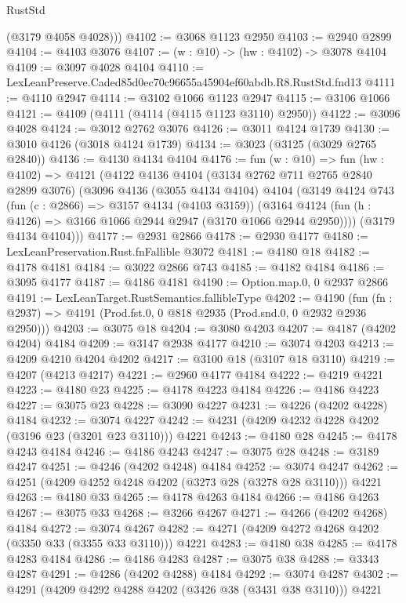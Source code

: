 \begin{lexlean}{RustStd}
\begin{coremodule}
        (@3179 @4058 @4028)))
@4102 := @3068 @1123 @2950
@4103 := @2940 @2899
@4104 := @4103 @3076
@4107 := (w : @10) -> (hw : @4102) -> @3078 @4104
@4109 := @3097 @4028 @4104
@4110 := LexLeanPreserve.Caded85d0ec70c96655a45904ef60abdb.R8.RustStd.fnd13
@4111 := @4110 @2947
@4114 := @3102 @1066 @1123 @2947
@4115 := @3106 @1066
@4121 := @4109 (@4111 (@4114 (@4115 @1123 @3110) @2950))
@4122 := @3096 @4028
@4124 := @3012 @2762 @3076
@4126 := @3011 @4124 @1739
@4130 := @3010 @4126 (@3018 @4124 @1739)
@4134 := @3023 (@3125 (@3029 @2765 @2840))
@4136 := @4130 @4134 @4104
@4176 := fun (w : @10) =>
  fun (hw : @4102) =>
  @4121
    (@4122
      @4136
      @4104
      (@3134 @2762 @711 @2765 @2840 @2899 @3076)
      (@3096
        @4136
        (@3055 @4134 @4104)
        @4104
        (@3149
          @4124
          @743
          (fun (c : @2866) => @3157 @4134 (@4103 @3159))
          (@3164 @4124 (fun (h : @4126) => @3166 @1066 @2944 @2947 (@3170 @1066 @2944 @2950))))
        (@3179 @4134 @4104)))
@4177 := @2931 @2866
@4178 := @2930 @4177
@4180 := LexLeanPreservation.Rust.fnFallible @3072
@4181 := @4180 @18
@4182 := @4178 @4181
@4184 := @3022 @2866 @743
@4185 := @4182 @4184
@4186 := @3095 @4177
@4187 := @4186 @4181
@4190 := Option.map.{0, 0} @2937 @2866
@4191 := LexLeanTarget.RustSemantics.fallibleType
@4202 := @4190
    (fun (fn : @2937) => @4191 (Prod.fst.{0, 0} @818 @2935 (Prod.snd.{0, 0} @2932 @2936 @2950)))
@4203 := @3075 @18
@4204 := @3080 @4203
@4207 := @4187 (@4202 @4204) @4184
@4209 := @3147 @2938 @4177
@4210 := @3074 @4203
@4213 := @4209 @4210 @4204 @4202
@4217 := @3100 @18 (@3107 @18 @3110)
@4219 := @4207 (@4213 @4217)
@4221 := @2960 @4177 @4184
@4222 := @4219 @4221
@4223 := @4180 @23
@4225 := @4178 @4223 @4184
@4226 := @4186 @4223
@4227 := @3075 @23
@4228 := @3090 @4227
@4231 := @4226 (@4202 @4228) @4184
@4232 := @3074 @4227
@4242 := @4231 (@4209 @4232 @4228 @4202 (@3196 @23 (@3201 @23 @3110))) @4221
@4243 := @4180 @28
@4245 := @4178 @4243 @4184
@4246 := @4186 @4243
@4247 := @3075 @28
@4248 := @3189 @4247
@4251 := @4246 (@4202 @4248) @4184
@4252 := @3074 @4247
@4262 := @4251 (@4209 @4252 @4248 @4202 (@3273 @28 (@3278 @28 @3110))) @4221
@4263 := @4180 @33
@4265 := @4178 @4263 @4184
@4266 := @4186 @4263
@4267 := @3075 @33
@4268 := @3266 @4267
@4271 := @4266 (@4202 @4268) @4184
@4272 := @3074 @4267
@4282 := @4271 (@4209 @4272 @4268 @4202 (@3350 @33 (@3355 @33 @3110))) @4221
@4283 := @4180 @38
@4285 := @4178 @4283 @4184
@4286 := @4186 @4283
@4287 := @3075 @38
@4288 := @3343 @4287
@4291 := @4286 (@4202 @4288) @4184
@4292 := @3074 @4287
@4302 := @4291 (@4209 @4292 @4288 @4202 (@3426 @38 (@3431 @38 @3110))) @4221

\end{coremodule}
\end{lexlean}
